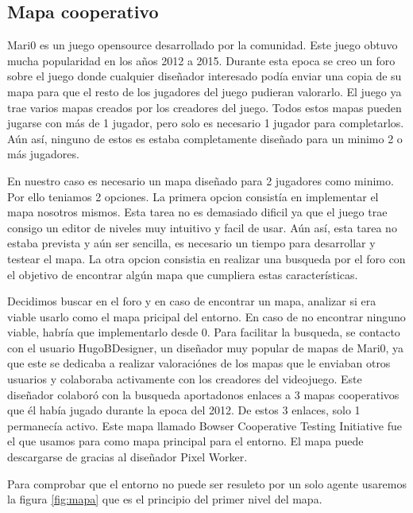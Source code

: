 \subsection{Mapa cooperativo}
Mari0 es un juego opensource desarrollado por la comunidad. Este juego obtuvo mucha popularidad en los años 2012 a 2015. Durante esta epoca se creo un foro sobre el juego donde cualquier diseñador interesado podía enviar una copia de su mapa para que el resto de los jugadores del juego pudieran valorarlo. El juego ya trae varios mapas creados por los creadores del juego. Todos estos mapas pueden jugarse con más de 1 jugador, pero solo es necesario 1 jugador para completarlos. Aún así, ninguno de estos es estaba completamente diseñado para un minimo 2 o más jugadores.

En nuestro caso es necesario un mapa diseñado para 2 jugadores como minimo. Por ello teniamos 2 opciones. La primera opcion consistía en implementar el mapa nosotros mismos. Esta tarea no es demasiado dificil ya que el juego trae consigo un editor de niveles muy intuitivo y facil de usar. Aún así, esta tarea no estaba prevista y aún ser sencilla, es necesario un tiempo para desarrollar y testear el mapa. La otra opcion consistia en realizar una busqueda por el foro \cite{mari0-forum} con el objetivo de encontrar algún mapa que cumpliera estas características. 

Decidimos buscar en el foro y en caso de encontrar un mapa, analizar si era viable usarlo como el mapa pricipal del entorno. En caso de no encontrar ninguno viable, habría que implementarlo desde 0. Para facilitar la busqueda, se contacto con el usuario HugoBDesigner, un diseñador muy popular de mapas de Mari0, ya que este se dedicaba a realizar valoraciónes de los mapas que le enviaban otros usuarios y colaboraba activamente con los creadores del videojuego. Este diseñador colaboró con la busqueda aportadonos enlaces a 3 mapas cooperativos que él había jugado durante la epoca del 2012. De estos 3 enlaces, solo 1 permanecía activo. Este mapa llamado Bowser Cooperative Testing Initiative fue el que usamos para como mapa principal para el entorno. El mapa puede descargarse de \cite {mari0-mapa} gracias al diseñador Pixel Worker. 

Para comprobar que el entorno no puede ser resuleto por un solo agente usaremos la figura \ref {fig:mapa} que es el principio del primer nivel del mapa.

